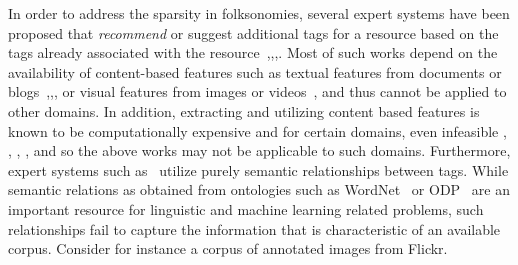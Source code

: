 In order to address the sparsity in folksonomies, several expert systems have been proposed that \textit{recommend} or suggest additional tags for a resource based on the tags already associated with the resource~\cite{SunLang11},\cite{sigurbjornsson2008flickr},\cite{HsiehCollab09},\cite{ChenEstim15}. Most of such works depend on the availability of content-based features such as textual features from documents or blogs~\cite{HsiehCollab09},\cite{ChenEstim15},\cite{SunLang11}, or visual features from images or videos~\cite{ZhaoqiangRegulariz15}, and thus cannot be applied to other domains. 
In addition, extracting and utilizing content based features is known to be computationally expensive and for certain domains, even infeasible \cite{huang2010text}, \cite{song2010taxonomic}, \cite{zanetti2008walk}, \cite{yin2009exploring}, and so the above works may not be applicable to such domains. 
Furthermore, expert systems such as~\cite{MohdSemantic13} utilize purely semantic relationships between tags. While semantic relations as obtained from ontologies such as WordNet~\cite{wordnet} or ODP~\cite{website:ODP} are an important resource for linguistic and machine learning related problems, such relationships fail to capture the information that is characteristic of an available corpus. Consider for instance a corpus of annotated images from Flickr.
